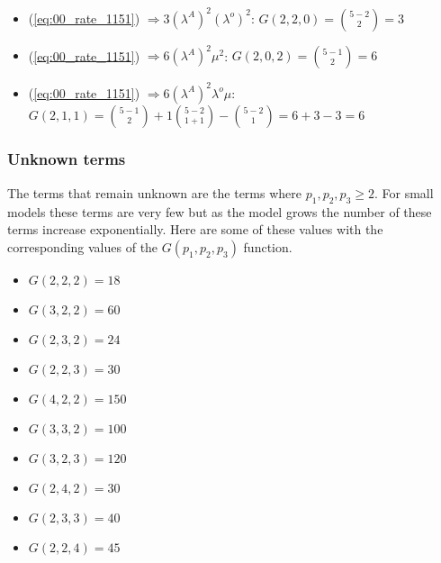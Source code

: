 \begin{multicols}{2}
\begin{itemize}
        \item (\ref{eq:00_rate_1151}) \( \Rightarrow 3 (\lambda^A)^2 (\lambda^o)^2 \): \(G(2,2,0) = \binom{5-2}{2} = 3\)
        \item (\ref{eq:00_rate_1151}) \( \Rightarrow 6 (\lambda^A)^2 \mu ^ 2\): \(G(2,0,2) = \binom{5-1}{2} = 6\)
    \end{itemize}
\end{multicols}

\begin{itemize}
    \item (\ref{eq:00_rate_1151}) \( \Rightarrow 6 (\lambda^A)^2 \lambda^o \mu\): \(G(2,1,1) = \binom{5-1}{2} + 1\binom{5-2}{1+1} - \binom{5-2}{1} = 6 + 3 - 3 = 6\)
\end{itemize}



\subsubsection{Unknown terms}

The terms that remain unknown are the terms where \(p_1, p_2, p_3 \geq 2\). For small models these terms are very few but as the model grows the number of these terms increase exponentially. Here are some of these values with the corresponding values of the \(G(p_1,p_2,p_3)\) function.

\begin{multicols}{2}
    \begin{itemize}
        \item \(G(2,2,2) = 18\) 
        \item \(G(3,2,2) = 60\)
        \item \(G(2,3,2) = 24\)
        \item \(G(2,2,3) = 30\)
        \item \(G(4,2,2) = 150\)
        \item \(G(3,3,2) = 100\)
        \item \(G(3,2,3) = 120\)
        \item \(G(2,4,2) = 30\)
        \item \(G(2,3,3) = 40\)
        \item \(G(2,2,4) = 45\)
    \end{itemize}
\end{multicols}

